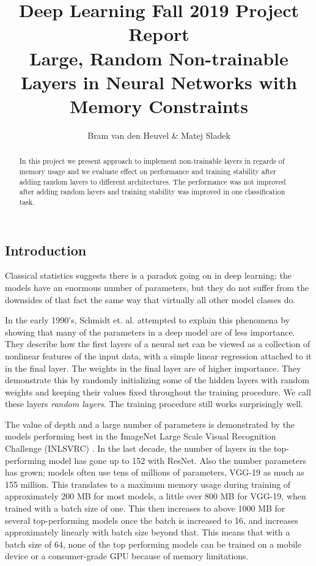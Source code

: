 \documentclass[]{article}
\title{Deep Learning Fall 2019 Project Report\\\large{Large, Random Non-trainable Layers in Neural Networks with Memory Constraints}}
\author{Bram van den Heuvel \& Matej Sladek}
\begin{document}
\maketitle

\begin{abstract}
	In this project we present approach to implement non-trainable layers in regards of memory usage and we evaluate effect on performance and training stability after adding random layers to different architectures. The performance was not improved after adding random layers and training stability was improved in one classification task.
\end{abstract}


\begin{multicols}{2}
	\section{Introduction}
	Classical statistics suggests there is a paradox going on in deep learning: the models have an enormous number of parameters, but they do not suffer from the downsides of that fact the same way that virtually all other model classes do.
	
	In the early 1990's, Schmidt et. al. \cite{Schmidt_Kraaijveld_Duin} attempted to explain this phenomena by showing that many of the parameters in a deep model are of less importance. They describe how the first layers of a neural net can be viewed as a collection of nonlinear features of the input data, with a simple linear regression attached to it in the final layer. The weights in the final layer are of higher importance. They demonstrate this by randomly initializing some of the hidden layers with random weights and keeping their values fixed throughout the training procedure. We call these layers \emph{random layers}. The training procedure still works surprisingly well.
	
	The value of depth and a large number of parameters is demonstrated by the models performing best in the ImageNet Large Scale Visual Recognition Challenge (INLSVRC) \cite{DBLP:journals/corr/CanzianiPC16}. In the last decade, the number of layers in the top-performing model has gone up to 152 with ResNet. Also the number parameters has grown; models often use tens of millions of parameters, VGG-19 as much as 155 million. This translates to a maximum memory usage during training of approximately 200 MB for most models, a little over 800 MB for VGG-19, when trained with a batch size of one. This then increases to above 1000 MB for several top-performing models once the batch is increased to 16, and increases approximately linearly with batch size beyond that. This means that with a batch size of 64, none of the top performing models can be trained on a mobile device or a consumer-grade GPU because of memory limitations.
	

\end{multicols}
\end{document}
